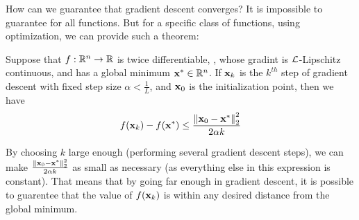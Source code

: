 How can we guarantee that gradient descent converges? It is impossible to guarantee for all functions. But for a specific class of functions, using \cvx{} optimization, we can provide such a theorem:

\begin{theorem}
    Suppose that $f : \R^n \rightarrow \R$ is twice differentiable, \cvx, whose gradint is $\Lip$-Lipschitz continuous, and has a global minimum $\vx^* \in \R^n$. 
    If $\vx_{k}$ is the $k^{th}$ step of gradient descent with fixed step size $\alpha < \frac{1}{L}$, and $\vx_0$ is the initialization point, then we have
    $$f(\vx_k) - f(\vx^*) \leq \frac{\norm{\vx_0 - \vx^*}_2^2}{2\alpha k}$$
\end{theorem}

\begin{remark}
    By choosing $k$ large enough (performing several gradient descent steps), we can make $\frac{\norm{\vx_0 - \vx^*}_2^2}{2\alpha k}$ as small as necessary (as everything else in this expression is constant). That means that by going far enough in gradient descent, it is possible to guarentee that the value of $f(\vx_k)$ is within any desired distance from the global minimum.
\end{remark}

